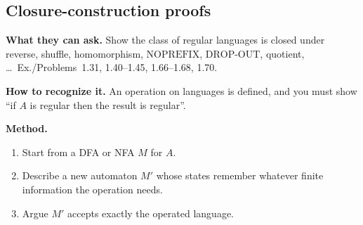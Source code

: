 \documentclass[11pt,a4paper]{article}
\begin{document}
\subsection{Closure-construction proofs}

\textbf{What they can ask.}
Show the class of regular languages is closed under reverse, shuffle,
homomorphism, $\mathrm{NOPREFIX}$, $\mathrm{DROP\text{-}OUT}$,
quotient, \ldots\ Ex./Problems~1.31, 1.40--1.45, 1.66--1.68, 1.70.

\textbf{How to recognize it.}
An operation on languages is defined, and you must show ``if $A$ is
regular then the result is regular''.

\textbf{Method.}
\begin{enumerate}
  \item Start from a DFA or NFA $M$ for $A$.
  \item Describe a new automaton $M'$ whose states remember whatever
        finite information the operation needs.
  \item Argue $M'$ accepts exactly the operated language.
\end{enumerate}
\end{document}
